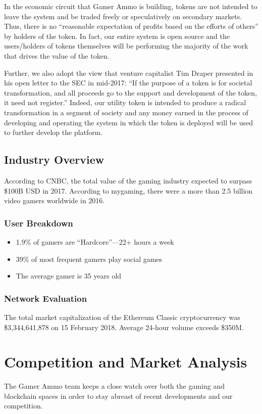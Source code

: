\documentclass[11pt]{report}
\begin{document}
In the economic circuit that Gamer Ammo is building, tokens are not intended to leave the system and be traded freely or speculatively on secondary markets. Thus, there is no ``reasonable expectation of profits based on the efforts of others'' by holders of the token. In fact, our entire system is open source and the users/holders of tokens themselves will be performing the majority of the work that drives the value of the token. 

Further, we also adopt the view that venture capitalist Tim Draper presented in his open letter to the SEC in mid-2017: ``If the purpose of a token is for societal transformation, and all proceeds go to the support and development of the token, it need not register.”\cite{tim-draper-tweet} Indeed, our utility token is intended to produce a radical transformation in a segment of society and any money earned in the process of developing and operating the system in which the token is deployed will be used to further develop the platform. 
\section{Industry Overview}
According to CNBC, the total value of the gaming industry expected to surpass \$100B USD in 2017.\cite{CNBC-gaming-market} According to mygaming, there were a more than 2.5 billion video gamers worldwide in 2016.\cite{number-of-gamers}
\subsection{User Breakdown}
\begin{itemize}
\item 1.9\% of gamers are “Hardcore”---22+ hours a week
\item 39\% of most frequent gamers play social games
\item The average gamer is 35 years old
\end{itemize}
\subsection{Network Evaluation}
The total market capitalization of the Ethereum Classic cryptocurrency was \$3,344,641,878 on 15 February 2018. Average 24-hour volume exceeds \$350M.\cite{ETC-market-data}\cite{worldcoin-ETC-market-data}
\chapter{Competition and Market Analysis}
The Gamer Ammo team keeps a close watch over both the gaming and blockchain spaces in order to stay abreast of recent developments and our competition.
\end{document}

